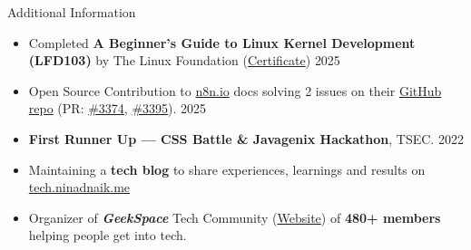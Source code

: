 \documentclass{resume} %
\begin{document}
\begin{rSection}{Additional Information}
    \begin{itemize}
        \setlength\itemsep{-0.6em}
        \item Completed \textbf{A Beginner's Guide to Linux Kernel Development (LFD103)} by The Linux Foundation (\href{https://ti-user-certificates.s3.amazonaws.com/e0df7fbf-a057-42af-8a1f-590912be5460/a8e2f5dd-6c6b-4ad1-b079-3d2622287ac5-ninad-naik-17a4be33-aebe-4a9f-b6e4-703b2ff6bd4c-certificate.pdf}{Certificate}) \hfill{2025}
        \item Open Source Contribution to \href{n8n.io}{n8n.io} docs solving 2 issues on their \href{https://github.com/n8n-io/n8n-docs}{GitHub repo} (PR: \href{https://github.com/n8n-io/n8n-docs/pull/3374}{\#3374}, \href{https://github.com/n8n-io/n8n-docs/pull/3395}{\#3395}). \hfill{2025}
        \item \textbf{First Runner Up — CSS Battle \& Javagenix Hackathon}, TSEC. \hfill {2022}
        \item Maintaining a \textbf{tech blog} to share experiences, learnings and results on \href{https://tech.ninadnaik.me}{tech.ninadnaik.me}
        \item Organizer of \textbf{\textit{GeekSpace}} Tech Community
              (\href{https://geekspaceclub.github.io}{Website}) of \textbf{480+ members} helping
              people get into tech.
    \end{itemize}

\end{rSection}

\end{document}
